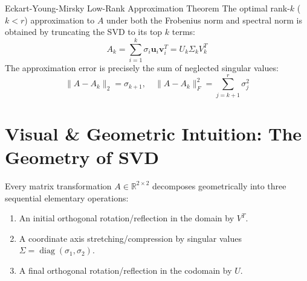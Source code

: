 \begin{theorembox}{Eckart-Young-Mirsky Low-Rank Approximation Theorem}
The optimal rank-$k$ ($k < r$) approximation to $A$ under both the Frobenius norm and spectral norm is obtained by truncating the SVD to its top $k$ terms:
\begin{equation}
A_k = \sum_{i=1}^k \sigma_i \mathbf{u}_i \mathbf{v}_i^T = U_k \Sigma_k V_k^T
\end{equation}
The approximation error is precisely the sum of neglected singular values:
\begin{equation}
\|A - A_k\|_2 = \sigma_{k+1}, \quad \|A - A_k\|_F^2 = \sum_{j=k+1}^r \sigma_j^2
\end{equation}
\end{theorembox}

\section{Visual \& Geometric Intuition: The Geometry of SVD}

Every matrix transformation $A \in \mathbb{R}^{2 \times 2}$ decomposes geometrically into three sequential elementary operations:
\begin{enumerate}
    \item An initial orthogonal rotation/reflection in the domain by $V^T$.
    \item A coordinate axis stretching/compression by singular values $\Sigma = \operatorname{diag}(\sigma_1, \sigma_2)$.
    \item A final orthogonal rotation/reflection in the codomain by $U$.
\end{enumerate}

